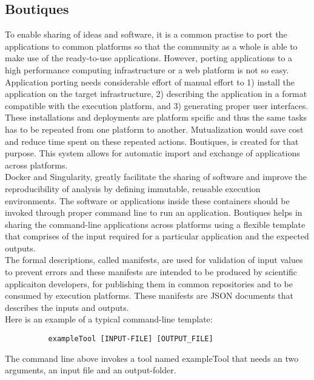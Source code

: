 \subsection{Boutiques}
To enable sharing of ideas and software, it is a common practise to port the applications to common platforms so that the community as a whole is able to make use of the ready-to-use applications. However, porting applications to a high performance computing infrastructure or a web platform is not so easy. Application porting needs considerable effort of manual effort to 1) install the application on the target infrastructure, 2) describing the application in a format compatible with the execution platform, and 3) generating proper user interfaces. These installations and deployments are platform spcific and thus the same tasks has to be repeated from one platform to another. Mutualization would save cost and reduce time spent on these repeated actions. Boutiques, is created for that purpose. This system allows for automatic import and exchange of applications across platforms.\\

Docker and Singularity, greatly facilitate the sharing of software and improve the reproducibility of analysis by defining immutable, reusable execution environments. The software or applications inside these containers should be invoked through proper command line to run an application. Boutiques helps in sharing the command-line applications across platforms using a flexible template that comprises of the input required for a particular application and the expected outputs.\\

The formal descriptions, called manifests, are used for validation of input values to prevent errors and these manifests are intended to be produced by scientific applicaiton developers, for publishing them in common repositories and to be consumed by execution platforms. These manifests are JSON documents that describes the inputs and outputs.\\

Here is an example of a typical command-line template:

\begin{verbatim}
          exampleTool [INPUT-FILE] [OUTPUT_FILE]
\end{verbatim}

The command line above invokes a tool named exampleTool that needs an two arguments, an input file and an output-folder.

